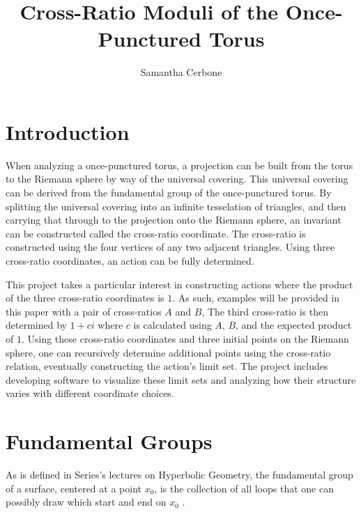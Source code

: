 \documentclass[12pt,a4paper,reqno,parskip=full]{amsart}
\numberwithin{equation}{section}
\theoremstyle{plain}
\theoremstyle{definition}
\begin{document}
\title{Cross-Ratio Moduli of the Once-Punctured Torus}

\author{Samantha Cerbone}

\maketitle

\section{Introduction}

When analyzing a once-punctured torus, a projection can be built from the torus to the Riemann sphere by way of the universal covering. This universal covering can be derived from the fundamental group of the once-punctured torus. By splitting the universal covering into an infinite tesselation of triangles, and then carrying that through to the projection onto the Riemann sphere, an invariant can be constructed called the cross-ratio coordinate. The cross-ratio is constructed using the four vertices of any two adjacent triangles. Using three cross-ratio coordinates, an action can be fully determined.

This project takes a particular interest in constructing actions where the product of the three cross-ratio coordinates is $1$. As such, examples will be provided in this paper with a pair of cross-ratios $A$ and $B$, The third cross-ratio is then determined by $1+ci$ where $c$ is calculated using $A$, $B$, and the expected product of $1$. Using these cross-ratio coordinates and three initial points on the Riemann sphere, one can recursively determine additional points using the cross-ratio relation, eventually constructing the action's limit set. The project includes developing software to visualize these limit sets and analyzing how their structure varies with different coordinate choices.

\section{Fundamental Groups}

As is defined in Series's lectures on Hyperbolic Geometry, the fundamental group of a surface, centered at a point $x_0$, is the collection of all loops that one can possibly draw which start and end on $x_0$ \cite{Series_Maloni_2013}. 
\end{document}
